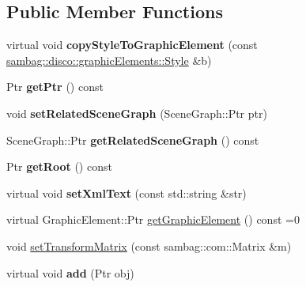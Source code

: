 \subsection*{Public Member Functions}
\begin{DoxyCompactItemize}
\item 
\hypertarget{classsambag_1_1disco_1_1svg_1_1_svg_object_a18da079e0214a0cae6918af69d7c42a4}{
virtual void {\bfseries copyStyleToGraphicElement} (const \hyperlink{classsambag_1_1disco_1_1graphic_elements_1_1_style}{sambag::disco::graphicElements::Style} \&b)}
\label{classsambag_1_1disco_1_1svg_1_1_svg_object_a18da079e0214a0cae6918af69d7c42a4}

\item 
\hypertarget{classsambag_1_1disco_1_1svg_1_1_svg_object_ac650d4e62c53e0011d31ca10ed6b4b33}{
Ptr {\bfseries getPtr} () const }
\label{classsambag_1_1disco_1_1svg_1_1_svg_object_ac650d4e62c53e0011d31ca10ed6b4b33}

\item 
\hypertarget{classsambag_1_1disco_1_1svg_1_1_svg_object_a19573df9bef92f94251ccade267a2d9e}{
void {\bfseries setRelatedSceneGraph} (SceneGraph::Ptr ptr)}
\label{classsambag_1_1disco_1_1svg_1_1_svg_object_a19573df9bef92f94251ccade267a2d9e}

\item 
\hypertarget{classsambag_1_1disco_1_1svg_1_1_svg_object_a4ee5a98b842ca4df824af38d51c75e29}{
SceneGraph::Ptr {\bfseries getRelatedSceneGraph} () const }
\label{classsambag_1_1disco_1_1svg_1_1_svg_object_a4ee5a98b842ca4df824af38d51c75e29}

\item 
\hypertarget{classsambag_1_1disco_1_1svg_1_1_svg_object_a960f18bbf9aec25098759ae14fc6dd36}{
Ptr {\bfseries getRoot} () const }
\label{classsambag_1_1disco_1_1svg_1_1_svg_object_a960f18bbf9aec25098759ae14fc6dd36}

\item 
\hypertarget{classsambag_1_1disco_1_1svg_1_1_svg_object_a17dfe153c81cd09b1e08b33d44cc4ef2}{
virtual void {\bfseries setXmlText} (const std::string \&str)}
\label{classsambag_1_1disco_1_1svg_1_1_svg_object_a17dfe153c81cd09b1e08b33d44cc4ef2}

\item 
virtual GraphicElement::Ptr \hyperlink{classsambag_1_1disco_1_1svg_1_1_svg_object_ade2fddb3895338d0f294e7f5de1e4a80}{getGraphicElement} () const =0
\item 
void \hyperlink{classsambag_1_1disco_1_1svg_1_1_svg_object_a0869371b11d31c42bc57868ded63a9e1}{setTransformMatrix} (const sambag::com::Matrix \&m)
\item 
\hypertarget{classsambag_1_1disco_1_1svg_1_1_svg_object_a49dd6c1e536f75aa48aed82bb752f0e3}{
virtual void {\bfseries add} (Ptr obj)}
\label{classsambag_1_1disco_1_1svg_1_1_svg_object_a49dd6c1e536f75aa48aed82bb752f0e3}


\end{DoxyCompactItemize}
